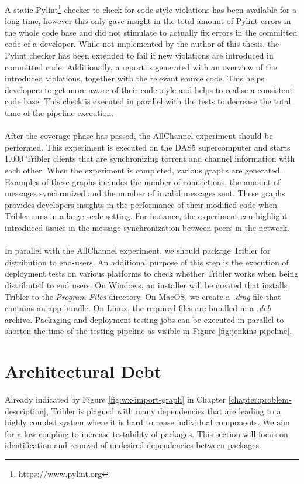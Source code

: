 A static Pylint\footnote{https://www.pylint.org} checker to check for code style violations has been available for a long time, however this only gave insight in the total amount of Pylint errors in the whole code base and did not stimulate to actually fix errors in the committed code of a developer. While not implemented by the author of this thesis, the Pylint checker has been extended to fail if new violations are introduced in committed code. Additionally, a report is generated with an overview of the introduced violations, together with the relevant source code. This helps developers to get more aware of their code style and helps to realise a consistent code base. This check is executed in parallel with the tests to decrease the total time of the pipeline execution.\\\\
After the coverage phase has passed, the AllChannel experiment should be performed. This experiment is executed on the DAS5 supercomputer and starts 1.000 Tribler clients that are synchronizing torrent and channel information with each other. When the experiment is completed, various graphs are generated. Examples of these graphs includes the number of connections, the amount of messages synchronized and the number of invalid messages sent. These graphs provides developers insights in the performance of their modified code when Tribler runs in a large-scale setting. For instance, the experiment can highlight introduced issues in the message synchronization between peers in the network.\\\\
In parallel with the AllChannel experiment, we should package Tribler for distribution to end-users. An additional purpose of this step is the execution of deployment tests on various platforms to check whether Tribler works when being distributed to end users. On Windows, an installer will be created that installs Tribler to the \emph{Program Files} directory. On MacOS, we create a \emph{.dmg} file that contains an app bundle. On Linux, the required files are bundled in a \emph{.deb} archive. Packaging and deployment testing jobs can be executed in parallel to shorten the time of the testing pipeline as visible in Figure \ref{fig:jenkins-pipeline}.

\section{Architectural Debt}
Already indicated by Figure \ref{fig:wx-import-graph} in Chapter \ref{chapter:problem-description}, Tribler is plagued with many dependencies that are leading to a highly coupled system where it is hard to reuse individual components. We aim for a low coupling to increase testability of packages. This section will focus on identification and removal of undesired dependencies between packages.


